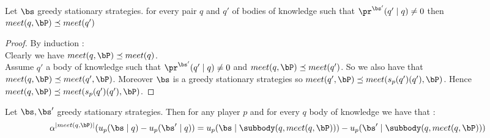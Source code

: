 \begin{mylem}
	\label{lem-meet}
	Let $\bs$ greedy stationary strategies. for every pair $q$ and $q'$ of bodies of knowledge such that $\pr^{\bs'}(q' \mid q) \neq 0$ then $meet(q,\bP) \preceq meet(q')$
\end{mylem}	
\begin{proof}
	By induction : 
	\\Clearly we have $meet(q,\bP) \preceq meet(q)$.
	\\Assume $q'$ a body of knowledge such that $\pr^{\bs'}(q' \mid q) \neq 0$ and $meet(q,\bP) \preceq meet(q')$. So we also have that $meet(q,\bP) \preceq meet(q',\bP)$. Moreover $\bs$ is a greedy stationary strategies so $meet(q',\bP) \preceq meet(s_p(q')(q'),\bP)$. Hence $meet(q,\bP) \preceq meet(s_p(q')(q'),\bP)$.
	
\end{proof}

\begin{mylem}
	\label{lemsup}
	Let $\bs, \bs'$ greedy stationary strategies. Then for any player $p$ and for every $q$ body of knowledge we have that :  $$\alpha^{|meet(q,\bP)|} (u_p(\bs \mid q) - u_p(\bs' \mid q))  =  u_p(\bs \mid \subbody(q,meet(q,\bP))) - u_p(\bs' \mid \subbody(q,meet(q,\bP)))$$ 
\end{mylem}

